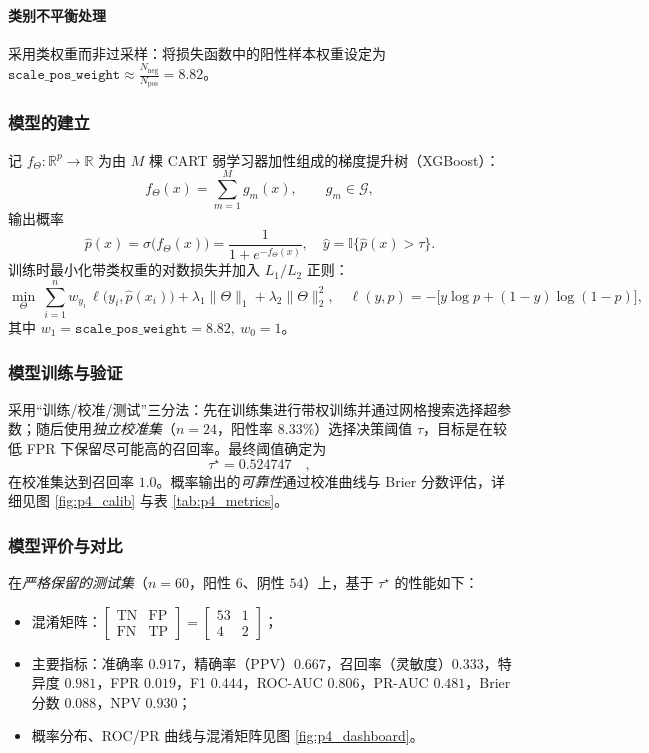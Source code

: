 \documentclass[withoutpreface]{cumcmthesis}
\begin{document}
\paragraph{类别不平衡处理} 采用类权重而非过采样：将损失函数中的阳性样本权重设定为 $\texttt{scale\_pos\_weight}\approx\frac{N_{\text{neg}}}{N_{\text{pos}}}=8.82$。

\subsubsection{模型的建立}
记 $f_\Theta:\mathbb{R}^p\!\to\!\mathbb{R}$ 为由 $M$ 棵 CART 弱学习器加性组成的梯度提升树（XGBoost）：
\[
f_\Theta(x)=\sum_{m=1}^{M} g_m(x),\qquad g_m\in\mathcal{G}, 
\]
输出概率
\[
\hat{p}(x)=\sigma\!\big(f_\Theta(x)\big)=\frac{1}{1+e^{-f_\Theta(x)}},\quad \hat{y}=\mathbb{I}\{\hat{p}(x)>\tau\}.
\]
训练时最小化带类权重的对数损失并加入 $L_1/L_2$ 正则：
\[
\min_{\Theta}\ \sum_{i=1}^{n}w_{y_i}\,\ell\!\big(y_i,\hat{p}(x_i)\big)
+\lambda_1\|\Theta\|_{1}+\lambda_2\|\Theta\|_{2}^{2},\quad 
\ell(y,p)=-\big[y\log p+(1-y)\log(1-p)\big],
\]
其中 $w_{1}=\texttt{scale\_pos\_weight}=8.82,\ w_{0}=1$。

\subsubsection{模型训练与验证}
采用“训练/校准/测试”三分法：先在训练集进行带权训练并通过网格搜索选择超参数；随后使用\emph{独立校准集}（$n=24$，阳性率 $8.33\%$）选择决策阈值 $\tau$，目标是在较低 FPR 下保留尽可能高的召回率。最终阈值确定为
\[
\tau^\star=0.524747\quad,
\]
在校准集达到召回率 $1.0$。概率输出的\emph{可靠性}通过校准曲线与 Brier 分数评估，详细见图 \ref{fig:p4_calib} 与表 \ref{tab:p4_metrics}。

\subsubsection{模型评价与对比}
在\emph{严格保留的测试集}（$n=60$，阳性 $6$、阴性 $54$）上，基于 $\tau^\star$ 的性能如下：
\begin{itemize}
\item 混淆矩阵：$\begin{bmatrix}\text{TN}&\text{FP}\\ \text{FN}&\text{TP}\end{bmatrix}=\begin{bmatrix}53&1\\4&2\end{bmatrix}$；
\item 主要指标：准确率 $0.917$，精确率（PPV）$0.667$，召回率（灵敏度）$0.333$，特异度 $0.981$，FPR $0.019$，F1 $0.444$，ROC-AUC $0.806$，PR-AUC $0.481$，Brier 分数 $0.088$，NPV $0.930$；
\item 概率分布、ROC/PR 曲线与混淆矩阵见图 \ref{fig:p4_dashboard}。
\end{itemize}
\end{document}
